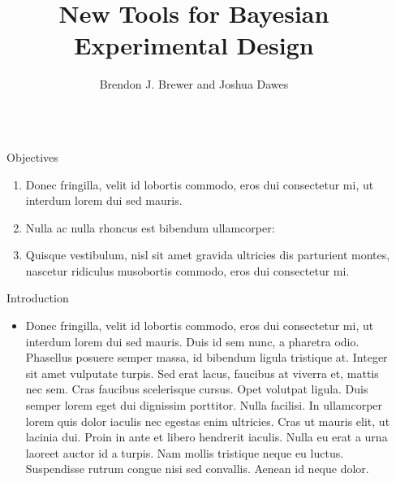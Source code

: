 \documentclass[final,hyperref={pdfpagelabels=false}]{beamer}
\title{\huge New Tools for Bayesian Experimental Design} %
\author{Brendon J. Brewer and Joshua Dawes} %
\institute{Department of Statistics, The University of Auckland} %
\begin{document}

\begin{frame}[t] %

\begin{columns}[t] %

\begin{column}{.02\textwidth}\end{column} %

\begin{column}{.465\textwidth} %


\begin{block}{Objectives}

\begin{enumerate}
\item Donec fringilla, velit id lobortis commodo, eros dui consectetur mi, ut interdum lorem dui sed mauris.
\item Nulla ac nulla rhoncus est bibendum ullamcorper:
\item Quisque vestibulum, nisl sit amet gravida ultricies dis parturient montes, nascetur ridiculus musobortis commodo, eros dui consectetur mi.
\end{enumerate}

\end{block}

            
\begin{block}{Introduction}

\begin{itemize}
\item Donec fringilla, velit id lobortis commodo, eros dui consectetur mi, ut interdum lorem dui sed mauris. Duis id sem nunc, a pharetra odio. Phasellus posuere \alert{semper massa}, id bibendum ligula tristique at. Integer sit amet vulputate turpis. Sed erat lacus, faucibus at viverra et, mattis nec sem. Cras faucibus \alert{scelerisque} cursus. Opet volutpat ligula. Duis semper lorem eget dui dignissim porttitor. Nulla facilisi. In ullamcorper lorem quis dolor iaculis nec egestas enim ultricies. Cras ut mauris elit, ut lacinia dui. Proin in ante et libero hendrerit iaculis. Nulla eu erat a urna laoreet auctor id a turpis. Nam mollis tristique neque eu luctus. Suspendisse rutrum congue nisi sed convallis. Aenean id neque dolor.
\end{itemize}


\end{block}
\end{column}
\end{columns}
\end{frame}
\end{document}
